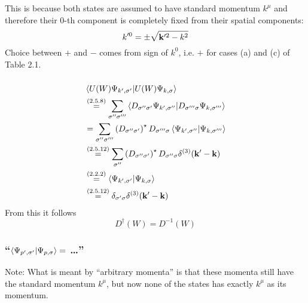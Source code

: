 This is because both states are assumed to have standard momentum $k^\mu$ and therefore their 0-th component is completely fixed from their spatial components:
\[k^{\prime 0}=\pm \sqrt{\mathbf{k}^{\prime 2}-k^2}\]
Choice between $+$ and $-$ comes from sign of $k^0$, i.e. $+$ for cases (a) and (c) of Table 2.1.
\subsubsection{ }
\begin{align*} 
	&\innerproduct{U(W)\Psi_{k^\prime,\sigma^\prime}}{U(W)\Psi_{k,\sigma}}\\
	&\overset{\eqc{2.5.8}}{=}\sum\limits_{\sigma^{\prime\prime}\sigma^{\prime\prime\prime}}\innerproduct{D_{\sigma^{\prime\prime} \sigma^{\prime}}\Psi_{k^\prime,\sigma^{\prime\prime}}}{D_{\sigma^{\prime\prime\prime} \sigma}\Psi_{k,\sigma^{\prime\prime\prime}}}\\
	&=\sum\limits_{\sigma^{\prime\prime}\sigma^{\prime\prime\prime}}\left(D_{\sigma^{\prime\prime} \sigma^{\prime}}\right)^\star D_{\sigma^{\prime\prime\prime} \sigma} \innerproduct{\Psi_{k^\prime,\sigma^{\prime\prime}}}{\Psi_{k,\sigma^{\prime\prime\prime}}}\\
	&\overset{\eqc{2.5.12}}{=}\sum\limits_{\sigma^{\prime\prime}}\left(D_{\sigma^{\prime\prime} \sigma^{\prime}}\right)^\star D_{\sigma^{\prime\prime} \sigma} \delta^{(3)}(\tvec{k}^\prime- \tvec{k})\\
	&\overset{\eqc{2.2.2}}{=}\innerproduct{\Psi_{k^\prime,\sigma^\prime}}{\Psi_{k,\sigma}}\\
	&\overset{\eqc{2.5.12}}{=} \delta_{\sigma^\prime \sigma} \delta^{(3)}(\tvec{k}^\prime- \tvec{k})
\end{align*}
From this it follows \[D^\dagger(W)=D^{-1}(W)\]

\subsubsection{\enquote{$\innerproduct{\Psi_{p^\prime,\sigma^\prime}}{\Psi_{p,\sigma}}=$ \dots} }
{\color{red}Note:} What is meant by \enquote{arbitrary momenta} is that these momenta still have the standard momentum $k^\mu$, but now none of the states has exactly $k^\mu$ as its momentum.


